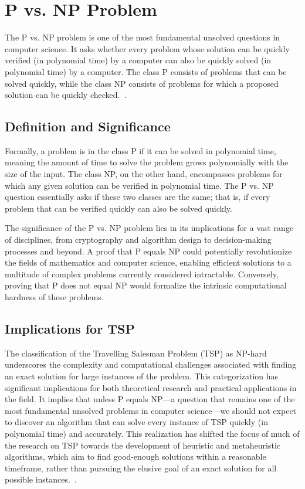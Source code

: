 \section{P vs. NP Problem}

The P vs. NP problem is one of the most fundamental unsolved questions in computer science. It asks whether every problem whose solution can be quickly verified (in polynomial time) by a computer can also be quickly solved (in polynomial time) by a computer. The class P consists of problems that can be solved quickly, while the class NP consists of problems for which a proposed solution can be quickly checked.~\cite{PvsNP}.

\subsection{Definition and Significance}

Formally, a problem is in the class P if it can be solved in polynomial time, meaning the amount of time to solve the problem grows polynomially with the size of the input. The class NP, on the other hand, encompasses problems for which any given solution can be verified in polynomial time. The P vs. NP question essentially asks if these two classes are the same; that is, if every problem that can be verified quickly can also be solved quickly.

The significance of the P vs. NP problem lies in its implications for a vast range of disciplines, from cryptography and algorithm design to decision-making processes and beyond. A proof that P equals NP could potentially revolutionize the fields of mathematics and computer science, enabling efficient solutions to a multitude of complex problems currently considered intractable. Conversely, proving that P does not equal NP would formalize the intrinsic computational hardness of these problems.

\subsection{Implications for TSP}

The classification of the Travelling Salesman Problem (TSP) as NP-hard underscores the complexity and computational challenges associated with finding an exact solution for large instances of the problem. This categorization has significant implications for both theoretical research and practical applications in the field. It implies that unless P equals NP—a question that remains one of the most fundamental unsolved problems in computer science—we should not expect to discover an algorithm that can solve every instance of TSP quickly (in polynomial time) and accurately. This realization has shifted the focus of much of the research on TSP towards the development of heuristic and metaheuristic algorithms, which aim to find good-enough solutions within a reasonable timeframe, rather than pursuing the elusive goal of an exact solution for all possible instances.~\cite{Karp1972}.

